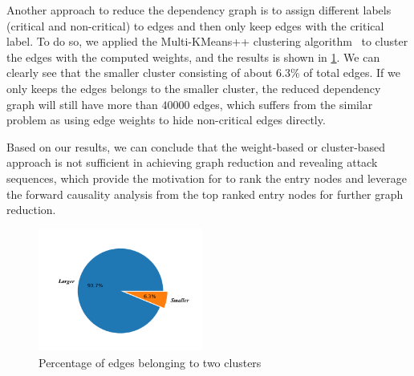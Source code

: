 Another approach to reduce the dependency graph is to assign different labels (\ie critical and non-critical) to edges and then only keep edges with the critical label. 
To do so, we applied the Multi-KMeans++ clustering algorithm~\cite{Arthur:2007:KAC:1283383.1283494} to cluster the edges with the computed weights, and the results is shown in \cref{fig:onlyCluster}.
We can clearly see that the smaller cluster consisting of about 6.3\% of total edges. 
If we only keeps the edges belongs to the smaller cluster, the reduced dependency graph will still have more than $40000$ edges, which suffers from the similar problem as using edge weights to hide non-critical edges directly.

Based on our results, we can conclude that the weight-based or cluster-based approach is not sufficient in achieving graph reduction and revealing attack sequences, which provide the motivation for \tool to rank the entry nodes and leverage the forward causality analysis from the top ranked entry nodes for further graph reduction.


\begin{figure}
    \centering
    \includegraphics[width=0.48\textwidth]{figs/usenix/cluster.png}
    \caption{Percentage of edges belonging to two clusters}
    \label{fig:onlyCluster}
\end{figure}


  